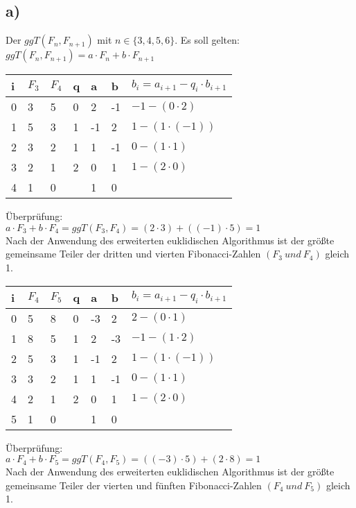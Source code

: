 \documentclass[11pt,a4paper]{article}
\begin{document}
\subsection*{a)}
Der $ggT(F_n, F_{n+1})$ mit $n \in \{3,4,5,6\}.$ Es soll gelten: $ggT(F_n, F_{n+1})=a\cdot F_n +b \cdot F_{n+1}$\\
\begin{center}
	\begin{tabular}{ | l | l | l | l | l | l | l|}
		\hline
		i&$F_3$&$F_4$&q&a&b&$b_i=a_{i+1}-q_i \cdot b_{i+1} $ \\
		\hline \hline
		0&3&5&0&2&-1&$-1-(0 \cdot 2 )$ \\ \hline
		1&5&3&1&-1&2&$1-(1 \cdot (-1))$ \\ \hline
		2&3&2&1&1&-1&$0-(1 \cdot 1)$ \\ \hline
		3&2&1&2&0&1&$1-(2\cdot 0)$ \\ \hline
		4&1&0&&1&0&\\ \hline
	\end{tabular}
\end{center}

Überprüfung:\\
$a\cdot F_3 +b \cdot F_4 = ggT(F_3,F_4)=(2\cdot 3)+((-1)\cdot5)=1$\\
Nach der Anwendung des erweiterten euklidischen Algorithmus ist der größte gemeinsame Teiler der dritten und vierten Fibonacci-Zahlen $(F_3~und~F_4)$ gleich 1.\\

\begin{center}
	\begin{tabular}{ | l | l | l | l | l | l | l|}
		\hline
		i&$F_4$&$F_5$&q&a&b&$b_i=a_{i+1}-q_i \cdot b_{i+1}$ \\ \hline	 \hline	
		0&5&8&0&-3&2&$2-(0 \cdot 1 )$ \\ \hline
		1&8&5&1&2&-3&$-1-(1 \cdot 2)$\\ \hline
		2&5&3&1&-1&2&$1-(1 \cdot (-1))$ \\ \hline
		3&3&2&1&1&-1&$0-(1 \cdot 1)$ \\ \hline
		4&2&1&2&0&1&$1-(2\cdot 0)$ \\ \hline
		5&1&0&&1&0&\\ \hline	
	\end{tabular}
\end{center}

Überprüfung:\\
$a\cdot F_4 +b \cdot F_5 = ggT(F_4,F_5)=((-3)\cdot5)+(2\cdot8)=1$\\
Nach der Anwendung des erweiterten euklidischen Algorithmus ist der größte gemeinsame Teiler der vierten und fünften Fibonacci-Zahlen $(F_4~und~F_5)$ gleich 1.\\
\end{document}
